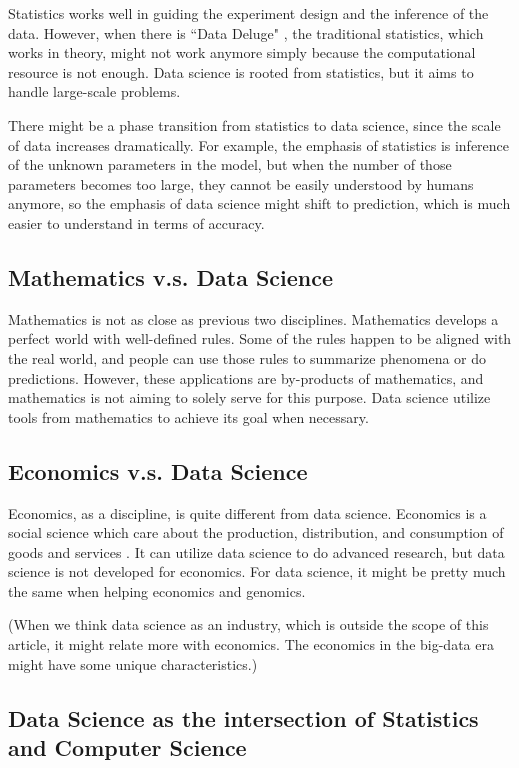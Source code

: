 Statistics works well in guiding the experiment design and the inference of the data.
However, when there is ``Data Deluge" \cite{hey_data_2003}, the traditional statistics, which works in theory, might not work anymore simply because the computational resource is not enough.
Data science is rooted from statistics, but it aims to handle large-scale problems. 

There might be a phase transition from statistics to data science, since the scale of data increases dramatically.
For example, the emphasis of statistics is inference of the unknown parameters in the model, but when the number of those parameters becomes too large, they cannot be easily understood by humans anymore, so the emphasis of data science might shift to prediction, which is much easier to understand in terms of accuracy.

\subsection*{Mathematics v.s. Data Science}

Mathematics is not as close as previous two disciplines.
Mathematics develops a perfect world with well-defined rules.
Some of the rules happen to be aligned with the real world, and people can use those rules to summarize phenomena or do predictions.
However, these applications are by-products of mathematics, and mathematics is not aiming to solely serve for this purpose. 
Data science utilize tools from mathematics to achieve its goal when necessary.

\subsection*{Economics v.s. Data Science}

Economics, as a discipline, is quite different from data science.
Economics is a social science which care about the production, distribution, and consumption of goods and services \cite{webster_economics}.
It can utilize data science to do advanced research, but data science is not developed for economics.
For data science, it might be pretty much the same when helping economics and genomics.

(When we think data science as an industry, which is outside the scope of this article, it might relate more with economics. The economics in the big-data era might have some unique characteristics.)

\subsection*{Data Science as the intersection of Statistics and Computer Science}

